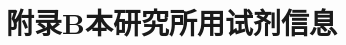 \chapter{附录B\quad 本研究所用试剂信息}
\renewcommand{\leftmark}{附录B\quad 本研究所用试剂信息}
\setcounter{chapter}{2}
\setcounter{figure}{0}
\setcounter{table}{0}

\blindtext

\blindtext

\blindtext